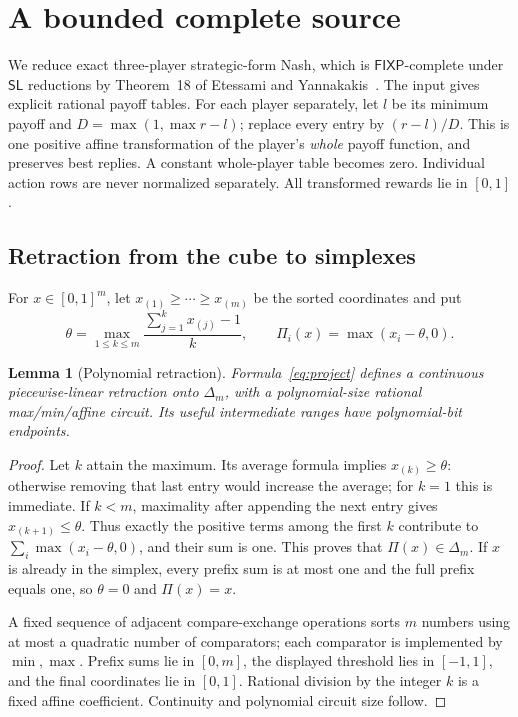 \documentclass[11pt,a4paper]{article}
\numberwithin{equation}{section}
\newtheorem{lemma}[theorem]{Lemma}
\theoremstyle{definition}
\newcommand{\FIXP}{\mathsf{FIXP}}
\newcommand{\SL}{\mathsf{SL}}
\begin{document}
\section{A bounded complete source}\label{sec:source}

We reduce exact three-player strategic-form Nash, which is
\(\FIXP\)-complete under \(\SL\) reductions by Theorem~18 of
Etessami and Yannakakis~\cite{EY}. The input gives explicit rational
payoff tables. For each player separately, let \(l\) be its minimum
payoff and \(D=\max(1,\max r-l)\); replace every entry by \((r-l)/D\).
This is one positive affine transformation of the player's \emph{whole}
payoff function, and preserves best replies. A constant whole-player
table becomes zero. Individual action rows are never normalized
separately. All transformed rewards lie in \([0,1]\).

\subsection{Retraction from the cube to simplexes}

For \(x\in[0,1]^m\), let \(x_{(1)}\geq\cdots\geq x_{(m)}\)
be the sorted coordinates and put
\begin{equation}\label{eq:project}
 \theta=\max_{1\leq k\leq m}
           \frac{\sum_{j=1}^k x_{(j)}-1}{k},
 \qquad \Pi_i(x)=\max(x_i-\theta,0).
\end{equation}

\begin{lemma}[Polynomial retraction]\label{lem:projection}
Formula~\eqref{eq:project} defines a continuous piecewise-linear
retraction onto \(\Delta_m\), with a polynomial-size rational
max/min/affine circuit. Its useful intermediate ranges have
polynomial-bit endpoints.
\end{lemma}
\begin{proof}
Let \(k\) attain the maximum. Its average formula implies
\(x_{(k)}\geq\theta\): otherwise removing that last entry would
increase the average; for \(k=1\) this is immediate.
If \(k<m\), maximality after appending the next entry gives
\(x_{(k+1)}\leq\theta\). Thus exactly the positive terms among the
first \(k\) contribute to \(\sum_i\max(x_i-\theta,0)\), and their
sum is one. This proves that \(\Pi(x)\in\Delta_m\).
If \(x\) is already in the simplex, every prefix sum is at most one
and the full prefix equals one, so \(\theta=0\) and \(\Pi(x)=x\).

A fixed sequence of adjacent compare-exchange operations sorts \(m\)
numbers using at most a quadratic number of comparators; each comparator
is implemented by \(\min,\max\). Prefix sums lie in \([0,m]\), the
displayed threshold lies in \([-1,1]\), and the final coordinates lie
in \([0,1]\). Rational division by the integer \(k\) is a fixed
affine coefficient. Continuity and polynomial circuit size follow.
\end{proof}
\end{document}

